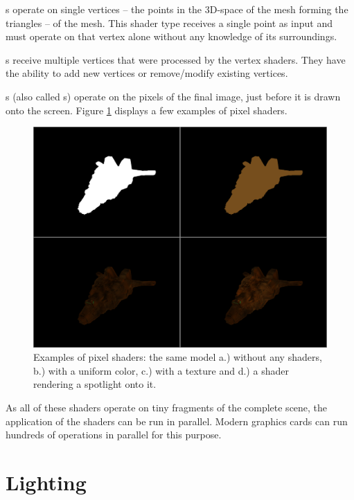 	\begin{smalllist}
		\item {}s operate on single vertices -- the points in the 3D-space of the mesh forming the triangles -- of the mesh. This shader type receives a single point as input and must operate on that vertex alone without any knowledge of its surroundings.
		\item {}s receive multiple vertices that were processed by the vertex shaders. They have the ability to add new vertices or remove/modify existing vertices.
		\item {}s (also called s) operate on the pixels of the final image, just before it is drawn onto the screen. Figure \ref{fig:Shaders} displays a few examples of pixel shaders.
	\end{smalllist}

	\begin{figure}[htbp]
		\centering
		\includegraphics[width=13.5cm]{images/shaders/shaders.png}
		\caption{Examples of pixel shaders: the same model a.) without any shaders, b.) with a uniform color, c.) with a texture and d.) a shader rendering a spotlight onto it.}
		\label{fig:Shaders}
	\end{figure}

	As all of these shaders operate on tiny fragments of the complete scene, the application of the shaders can be run in parallel. Modern graphics cards can run hundreds of operations in parallel for this purpose\cite{Nvi09}.

\section{Lighting}

